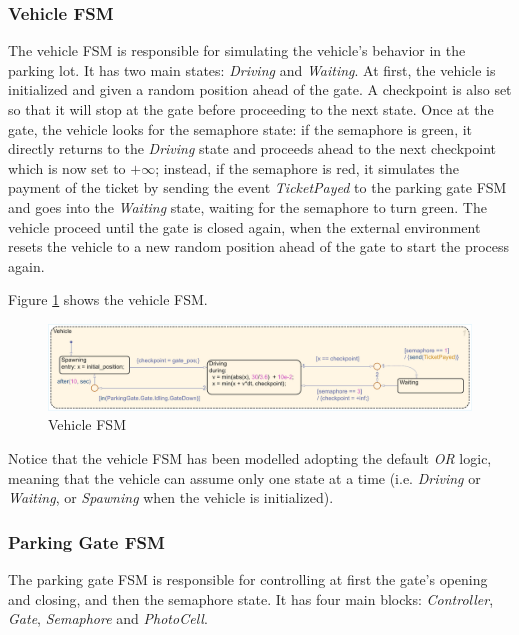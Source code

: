 \subsubsection{Vehicle FSM}
\label{subsubsec:vehicle_fsm}

The vehicle FSM is responsible for simulating the vehicle's behavior in the parking lot.
It has two main states: \textit{Driving} and \textit{Waiting}.
At first, the vehicle is initialized and given a random position ahead of the gate.
A checkpoint is also set so that it will stop at the gate before proceeding to the next state.
Once at the gate, the vehicle looks for the semaphore state: if the semaphore is green, it directly returns to the \textit{Driving} state and proceeds ahead to the next checkpoint which is now set to $+\infty$; instead, if the semaphore is red, it simulates the payment of the ticket by sending the event \textit{TicketPayed} to the parking gate FSM and goes into the \textit{Waiting} state, waiting for the semaphore to turn green.
The vehicle proceed until the gate is closed again, when the external environment resets the vehicle to a new random position ahead of the gate to start the process again.

Figure \ref{fig:vehicle_fsm} shows the vehicle FSM.

\begin{figure}[H]
    \centering
    \includegraphics[width=1.0\textwidth]{./img/MATLAB/vehicle_fsm.pdf}
    \caption{Vehicle FSM}
    \label{fig:vehicle_fsm}
\end{figure}

Notice that the vehicle FSM has been modelled adopting the default \textit{OR} logic, meaning that the vehicle can assume only one state at a time (i.e. \textit{Driving} or \textit{Waiting}, or \textit{Spawning} when the vehicle is initialized).



\subsubsection{Parking Gate FSM}
\label{subsubsec:parking_gate_fsm}

The parking gate FSM is responsible for controlling at first the gate's opening and closing, and then the semaphore state.
It has four main blocks: \textit{Controller}, \textit{Gate}, \textit{Semaphore} and \textit{PhotoCell}.


